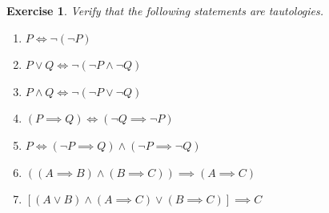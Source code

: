 \documentclass{article}[12pt]
\newtheorem{exercise}{Exercise}[section]
\begin{document}
        \begin{exercise}
            Verify that the following statements are tautologies.
            
            \begin{multicols}{2}
            \begin{enumerate}
                \item
                $P \iff \neg (\neg P)$
                
                \item 
                $P \lor Q  \iff \neg (\neg P \land \neg Q)$
                
                \item
                $P \land Q \iff \neg (\neg P \lor \neg Q)$
                
                \item\label{eqn:contraposition}
                $(P \implies Q) \iff (\neg Q \implies \neg P)$
                
                \item \label{eqn:contradiction}
                $P \iff (\neg P \implies Q) \land (\neg P \implies \neg Q)$
                
                \item
                $((A \implies B) \land (B \implies C)) \implies (A \implies C)$
                
                \item\label{eqn:pf-cases}
                $[(A \lor B) \land (A \implies C) \lor (B \implies C)] \implies C$

            \end{enumerate}
            \end{multicols}
            
        \end{exercise}
            
            
            
\end{document}
